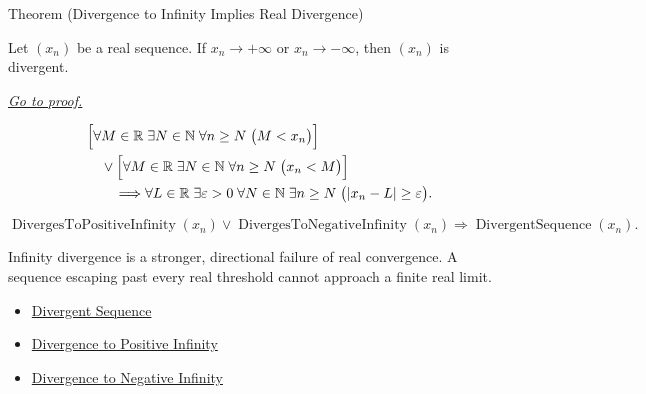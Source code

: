 
\begin{theorembox}{Theorem (Divergence to Infinity Implies Real Divergence)}
\begin{theorem}
\label{thm:divergence-to-infinity-implies-real-divergence}
Let $(x_n)$ be a real sequence. If $x_n\to+\infty$ or $x_n\to-\infty$,
then $(x_n)$ is divergent.

\smallskip
\noindent
\hyperref[prf:divergence-to-infinity-implies-real-divergence]{\textit{Go to proof.}}
\end{theorem}
\end{theorembox}

\begin{remark*}
\[
\begin{aligned}
&\Bigl[
  \forall M\in\mathbb{R}\;\exists N\in\mathbb{N}\;\forall n\ge N
  \;\bigl(M<x_n\bigr)
\Bigr]\\
&\quad\lor
\Bigl[
  \forall M\in\mathbb{R}\;\exists N\in\mathbb{N}\;\forall n\ge N
  \;\bigl(x_n<M\bigr)
\Bigr]\\
&\qquad\Longrightarrow
\forall L\in\mathbb{R}\;\exists \varepsilon>0\;\forall N\in\mathbb{N}
\;\exists n\ge N\;\bigl(|x_n-L|\ge\varepsilon\bigr).
\end{aligned}
\]
\end{remark*}

\begin{remark*}
\[
\operatorname{DivergesToPositiveInfinity}(x_n)
\lor
\operatorname{DivergesToNegativeInfinity}(x_n)
\Longrightarrow
\operatorname{DivergentSequence}(x_n).
\]
\end{remark*}

\begin{remark*}[Interpretation]
Infinity divergence is a stronger, directional failure of real convergence.
A sequence escaping past every real threshold cannot approach a finite real
limit.
\end{remark*}

\begin{remark*}[Dependencies]\hfill
\begin{itemize}
  \item \hyperref[def:divergent-sequence]{Divergent Sequence}
  \item \hyperref[def:diverges-to-positive-infinity]{Divergence to Positive Infinity}
  \item \hyperref[def:diverges-to-negative-infinity]{Divergence to Negative Infinity}
\end{itemize}
\end{remark*}

